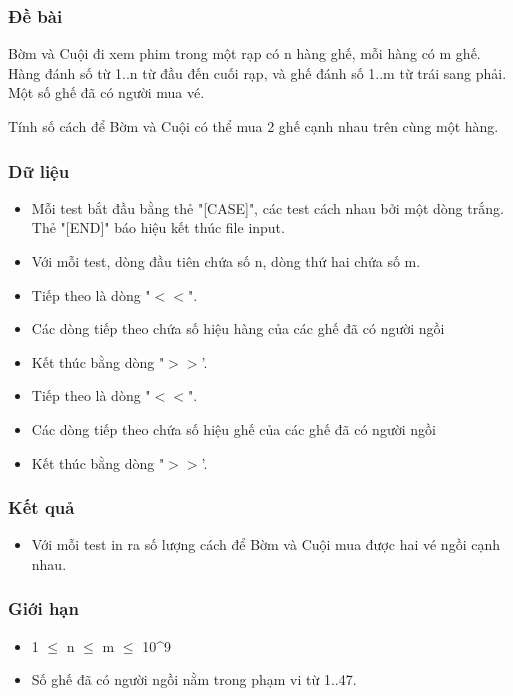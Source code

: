



\subsubsection{   Đề bài  }

   Bờm và Cuội đi xem phim trong một rạp có n hàng ghế, mỗi hàng có m ghế. Hàng đánh số từ 1..n từ đầu đến cuối rạp, và ghế đánh số 1..m từ trái sang phải. Một số ghế đã có người mua vé.  

   Tính số cách để Bờm và Cuội có thể mua 2 ghế cạnh nhau trên cùng một hàng.  

\subsubsection{   Dữ liệu  }
\begin{itemize}
	\item     Mỗi test bắt đầu bằng thẻ "[CASE]", các test cách nhau bởi một dòng trắng. Thẻ "[END]" báo hiệu kết thúc file input.   
	\item     Với mỗi test, dòng đầu tiên chứa số n, dòng thứ hai chứa số m.   
	\item     Tiếp theo là dòng "$<$$<$".   
	\item     Các dòng tiếp theo chứa số hiệu hàng của các ghế đã có người ngồi   
	\item     Kết thúc bằng dòng "$>$$>$'.   
	\item     Tiếp theo là dòng "$<$$<$".   
	\item     Các dòng tiếp theo chứa số hiệu ghế của các ghế đã có người ngồi   
	\item     Kết thúc bằng dòng "$>$$>$'.   
\end{itemize}

\subsubsection{   Kết quả  }
\begin{itemize}
	\item     Với mỗi test in ra số lượng cách để Bờm và Cuội mua được hai vé ngồi cạnh nhau.   
\end{itemize}

\subsubsection{   Giới hạn  }
\begin{itemize}
	\item     1  $\le$  n  $\le$  m  $\le$  10^9   
	\item     Số ghế đã có người ngồi nằm trong phạm vi từ 1..47.   
\end{itemize}

